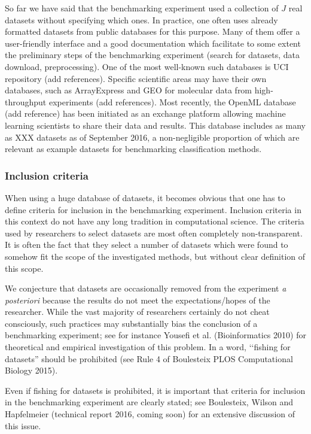 \documentclass[12pt]{article}
\begin{document}
So far we have said that the benchmarking experiment used a collection of $J$ real datasets without specifying which ones. In practice, one often uses already formatted datasets from public databases for this purpose. Many of them offer a user-friendly interface and a good documentation which facilitate to some extent the preliminary steps of the benchmarking experiment (search for datasets, data download, preprocessing). One of the most well-known such databases is UCI repository (add references). Specific scientific areas may have their own databases, such as ArrayExpress and GEO for molecular data from high-throughput experiments (add references). Most recently, the OpenML database (add reference) has been initiated as an exchange platform allowing machine learning scientists to share their data and results. This database includes as many as XXX datasets as of September 2016, a non-negligible proportion of which are relevant as example datasets for benchmarking classification methods.


\subsubsection{Inclusion criteria}
\label{subsubsec:incl}
When using a huge database of datasets, it becomes obvious that one has to define criteria for inclusion in the benchmarking experiment. Inclusion criteria in this context do not have any long tradition in computational science. The criteria used by researchers to select datasets are most often completely non-transparent. It is often the fact that they select a number of datasets which were found to somehow fit the scope of the investigated methods, but without clear definition of this scope. 

We conjecture that datasets are occasionally removed from the experiment {\it a posteriori} because the results do not meet the expectations/hopes of the researcher. While the vast majority of researchers certainly do not cheat consciously, such practices may substantially bias the conclusion of a benchmarking experiment; see for instance Yousefi et al. (Bioinformatics 2010) for theoretical and empirical investigation of this problem. In a word, \lq\lq fishing for datasets'' should be prohibited (see Rule 4 of Boulesteix PLOS Computational Biology 2015).

Even if fishing for datasets is prohibited, it is important that criteria for inclusion in the benchmarking experiment are clearly stated; see Boulesteix, Wilson and Hapfelmeier (technical report 2016, coming soon) for an extensive discussion of this issue.
\end{document}
